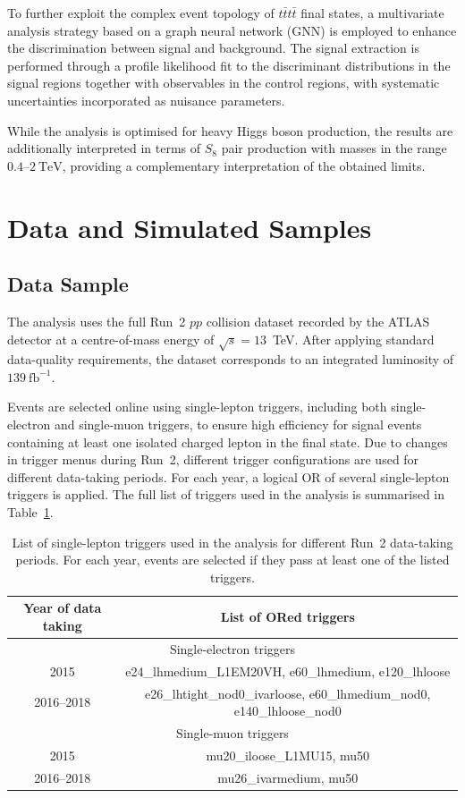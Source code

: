 To further exploit the complex event topology of $t\bar{t}t\bar{t}$ final states,
a multivariate analysis strategy based on a graph neural network (GNN)
is employed to enhance the discrimination between signal and
background. The signal extraction is performed through a profile
likelihood fit to the discriminant distributions in the signal
regions together with observables in the control regions, with
systematic uncertainties incorporated as nuisance parameters.

While the analysis is optimised for heavy Higgs boson production,
the results are additionally interpreted in terms of $S_{8}$ pair
production with masses in the range $0.4$--$2~\mathrm{TeV}$,
providing a complementary interpretation of the obtained limits.

\section{Data and Simulated Samples}

\subsection{Data Sample}
\label{subsec:data_sample}

The analysis uses the full Run~2 $pp$ collision dataset recorded by the ATLAS
detector at a centre-of-mass energy of $\sqrt{s}=13$~TeV.
After applying standard data-quality requirements, the dataset corresponds to an
integrated luminosity of $139~\mathrm{fb}^{-1}$.

Events are selected online using single-lepton triggers, including both single-electron
and single-muon triggers, to ensure high efficiency for signal events containing at least
one isolated charged lepton in the final state.
Due to changes in trigger menus during Run~2, different trigger configurations are used
for different data-taking periods.
For each year, a logical OR of several single-lepton triggers is applied.
The full list of triggers used in the analysis is summarised in
Table~\ref{tab:slep_trigger}.

\begin{table}[htbp]
\centering
\caption{List of single-lepton triggers used in the analysis for different Run~2
data-taking periods.
For each year, events are selected if they pass at least one of the listed triggers.}
\label{tab:slep_trigger}
\begin{tabular}{c|c}
\hline
Year of data taking & List of ORed triggers \\
\hline\hline
\multicolumn{2}{c}{Single-electron triggers} \\
\hline\hline
2015 & e24\_lhmedium\_L1EM20VH, e60\_lhmedium, e120\_lhloose \\
2016--2018 & e26\_lhtight\_nod0\_ivarloose, e60\_lhmedium\_nod0, e140\_lhloose\_nod0 \\
\hline\hline
\multicolumn{2}{c}{Single-muon triggers} \\
\hline\hline
2015 & mu20\_iloose\_L1MU15, mu50 \\
2016--2018 & mu26\_ivarmedium, mu50 \\
\hline
\end{tabular}
\end{table}

